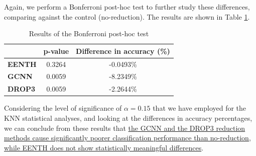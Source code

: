 Again, we perform a Bonferroni post-hoc test to further study these differences, comparing against the control (no-reduction). The results are shown in Table \ref{tab:knn:mush:red-posthoc}.
\begin{table}[h!]
    \centering
    \small
    \begin{tabular}{|l|c|c|}
    \hline
                             & \textbf{p-value} & \textbf{Difference in accuracy (\%)} \\ \hline
    \textbf{EENTH} & 0.3264           & -0.0493\%          \\ \hline
    \textbf{GCNN}           & 0.0059           & -8.2349\%          \\ \hline
    \textbf{DROP3}           & 0.0059           & -2.2644\%          \\ \hline
    \end{tabular}
    \caption{Results of the Bonferroni post-hoc test}
    \label{tab:knn:mush:red-posthoc}
\end{table}

Considering the level of significance of $ \alpha = 0.15 $ that we have employed for the KNN statistical analyses, and looking at the differences in accuracy percentages, we can conclude from these results that \uline{the GCNN and the DROP3 reduction methods cause significantly poorer classification performance than no-reduction, while EENTH does not show statistically meaningful differences}.

